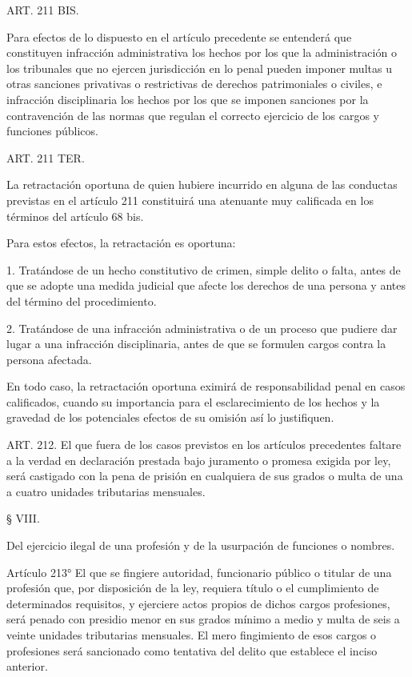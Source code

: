     ART. 211 BIS.

    Para efectos de lo dispuesto en el artículo precedente se entenderá que constituyen infracción administrativa los hechos por los que la administración o los tribunales que no ejercen jurisdicción en lo penal pueden imponer multas u otras sanciones privativas o restrictivas de derechos patrimoniales o civiles, e infracción disciplinaria los hechos por los que se imponen sanciones por la contravención de las normas que regulan el correcto ejercicio de los cargos y funciones públicos.

     
    ART. 211 TER.

    La retractación oportuna de quien hubiere incurrido en alguna de las conductas previstas en el artículo 211 constituirá una atenuante muy calificada en los términos del artículo 68 bis.
     
    Para estos efectos, la retractación es oportuna:
     
    1. Tratándose de un hecho constitutivo de crimen, simple delito o falta, antes de que se adopte una medida judicial que afecte los derechos de una persona y antes del término del procedimiento.

    2. Tratándose de una infracción administrativa o de un proceso que pudiere dar lugar a una infracción disciplinaria, antes de que se formulen cargos contra la persona afectada.
     
    En todo caso, la retractación oportuna eximirá de responsabilidad penal en casos calificados, cuando su importancia para el esclarecimiento de los hechos y la gravedad de los potenciales efectos de su omisión así lo justifiquen.



    ART. 212.
    El que fuera de los casos previstos en los artículos precedentes faltare a la verdad en declaración prestada bajo juramento o promesa exigida por ley, será castigado con la pena de prisión en cualquiera de sus grados o multa de una a cuatro unidades tributarias mensuales.

    § VIII.

    Del ejercicio ilegal de una profesión y de la usurpación de funciones o nombres.



    Artículo 213° El que se fingiere autoridad, funcionario público o titular de una profesión que, por disposición de la ley, requiera título o el cumplimiento de determinados requisitos, y ejerciere actos propios de dichos cargos profesiones, será penado con presidio menor en sus grados mínimo a medio y multa de seis a veinte unidades tributarias mensuales.
    El mero fingimiento de esos cargos o profesiones será sancionado como tentativa del delito que establece el inciso anterior.




